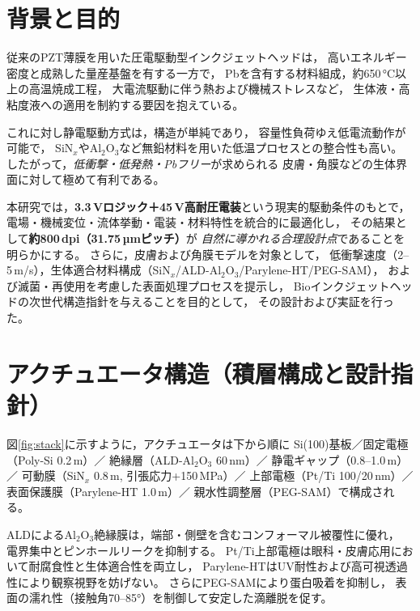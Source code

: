 \documentclass[conference]{IEEEtran}
\begin{document}
\section{背景と目的}
従来のPZT薄膜を用いた圧電駆動型インクジェットヘッドは，
高いエネルギー密度と成熟した量産基盤を有する一方で，
Pbを含有する材料組成，約650\,\si{\celsius}以上の高温焼成工程，
大電流駆動に伴う熱および機械ストレスなど，
生体液・高粘度液への適用を制約する要因を抱えている。

これに対し静電駆動方式は，構造が単純であり，
容量性負荷ゆえ低電流動作が可能で，
SiN$_x$やAl$_2$O$_3$など無鉛材料を用いた低温プロセスとの整合性も高い。
したがって，\emph{低衝撃・低発熱・Pbフリー}が求められる
皮膚・角膜などの生体界面に対して極めて有利である。

本研究では，\textbf{3.3\,Vロジック＋45\,V高耐圧電装}という現実的駆動条件のもとで，
電場・機械変位・流体挙動・電装・材料特性を統合的に最適化し，
その結果として\textbf{約800\,dpi（31.75\,µmピッチ）}が
\emph{自然に導かれる合理設計点}であることを明らかにする。
さらに，皮膚および角膜モデルを対象として，
低衝撃速度（2--5\,m/s），生体適合材料構成（SiN$_x$/ALD-Al$_2$O$_3$/Parylene-HT/PEG-SAM），
および滅菌・再使用を考慮した表面処理プロセスを提示し，
Bioインクジェットヘッドの次世代構造指針を与えることを目的として，
その設計および実証を行った。

\section{アクチュエータ構造（積層構成と設計指針）}
図\ref{fig:stack}に示すように，アクチュエータは下から順に
Si(100)基板／固定電極（Poly-Si 0.2\,\textmu m）／
絶縁層（ALD-Al$_2$O$_3$ 60\,nm）／
静電ギャップ（0.8--1.0\,\textmu m）／
可動膜（SiN$_x$ 0.8\,\textmu m, 引張応力+150\,MPa）／
上部電極（Pt/Ti 100/20\,nm）／
表面保護膜（Parylene-HT 1.0\,\textmu m）／
親水性調整層（PEG-SAM）で構成される。

ALDによるAl$_2$O$_3$絶縁膜は，端部・側壁を含むコンフォーマル被覆性に優れ，
電界集中とピンホールリークを抑制する。
Pt/Ti上部電極は眼科・皮膚応用において耐腐食性と生体適合性を両立し，
Parylene-HTはUV耐性および高可視透過性により観察視野を妨げない。
さらにPEG-SAMにより蛋白吸着を抑制し，
表面の濡れ性（接触角70--85°）を制御して安定した滴離脱を促す。
\end{document}

